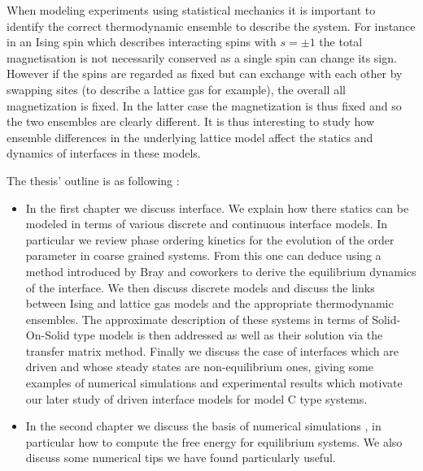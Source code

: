 When modeling experiments using statistical mechanics it is important to identify the correct thermodynamic ensemble to describe the system. For instance in an Ising spin which describes interacting spins with $s=\pm 1$ the total magnetisation is not necessarily conserved as a single spin can change its sign. However if the spins are regarded as fixed but can exchange with each other by swapping sites (to describe a lattice gas for example), the overall all magnetization is fixed. In the latter case the magnetization is thus fixed and so the two ensembles are clearly different. It is thus interesting to study how ensemble differences in the underlying lattice model affect the statics and dynamics of interfaces in these models.


The thesis' outline is as following :
\begin{itemize}
    \item In the first chapter we discuss interface. We explain how there statics can be modeled in terms of various discrete and continuous interface models. In particular we review phase ordering kinetics for the evolution of the order parameter in coarse grained systems. From this one can deduce using a method introduced by Bray and coworkers \cite{bray_interface_2001} to derive the equilibrium dynamics of the interface. We then discuss discrete models and discuss the links between Ising and lattice gas models and the appropriate thermodynamic ensembles. The approximate description of these systems in terms of Solid-On-Solid type models is then addressed as well as their solution via the transfer matrix method. Finally we discuss the case of interfaces which are driven and whose steady states are non-equilibrium ones, giving some examples of numerical simulations and experimental results which motivate our later study of driven interface models for model C type systems.
    \item In the second chapter we discuss the basis of numerical simulations \cite{newman_monte_1999}, in particular how to compute the free energy for equilibrium systems. We also discuss some numerical tips we have found particularly useful.

\end{itemize}
